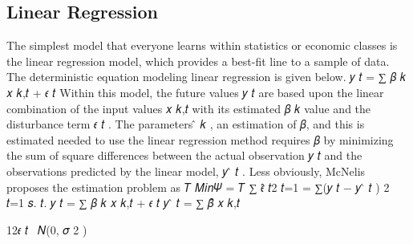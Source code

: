 \documentclass[../main.tex]{subfiles}
\begin{document}
    \subsection{Linear Regression}\label{subsec:linear-regression}
    The simplest model that everyone learns within statistics or economic classes is the linear regression model, which provides a best-fit line to a sample of data.
    The deterministic equation modeling linear regression is given below. 𝑦 𝑡 = ∑ 𝛽 𝑘 𝑥 𝑘,𝑡 + 𝜖 𝑡
    Within this model, the future values 𝑦 𝑡 are based upon the linear combination of the input values 𝑥 𝑘,𝑡 with its estimated 𝛽 𝑘 value and the disturbance term 𝜖 𝑡 .
    The parameters ̂ 𝑘 , an estimation of 𝛽, and this is estimated needed to use the linear regression method requires 𝛽 by minimizing the sum of square differences between the actual observation 𝑦 𝑡 and the observations predicted by the linear model, 𝑦 ̂ 𝑡 . %
    Less obviously, McNelis proposes the estimation problem as
    𝑇
    𝑀𝑖𝑛𝛹 =
    𝑇
    ∑ 𝜖̂ 𝑡2
    𝑡=1
    = ∑(𝑦 𝑡 − 𝑦 ̂ 𝑡 ) 2
    𝑡=1
    𝑠. 𝑡. 𝑦 𝑡 = ∑ 𝛽 𝑘 𝑥 𝑘,𝑡 + 𝜖 𝑡
    𝑦 ̂ 𝑡 = ∑ 𝛽̂ 𝑥 𝑘,𝑡

    12𝜖 𝑡 ~𝑁(0, 𝜎 2 )

\end{document}
